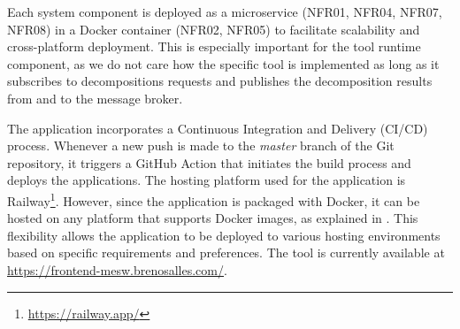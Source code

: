 Each system component is deployed as a microservice (NFR01, NFR04, NFR07,
NFR08) in a Docker container (NFR02, NFR05) to facilitate scalability and
cross-platform deployment. This is especially important for the tool runtime
component, as we do not care how the specific tool is implemented as long as it
subscribes to decompositions requests and publishes the decomposition results
from and to the message broker.

The application incorporates a Continuous Integration and Delivery (CI/CD)
process. Whenever a new push is made to the \textit{master} branch of the Git
repository, it triggers a GitHub Action that initiates the build process and
deploys the applications. The hosting platform used for the application is
Railway\footnote{\url{https://railway.app/}}. However, since the application is
packaged with Docker, it can be hosted on any platform that supports Docker
images, as explained in . This flexibility allows the
application to be deployed to various hosting environments based on specific
requirements and preferences. The tool is currently available at
\url{https://frontend-mesw.brenosalles.com/}.
